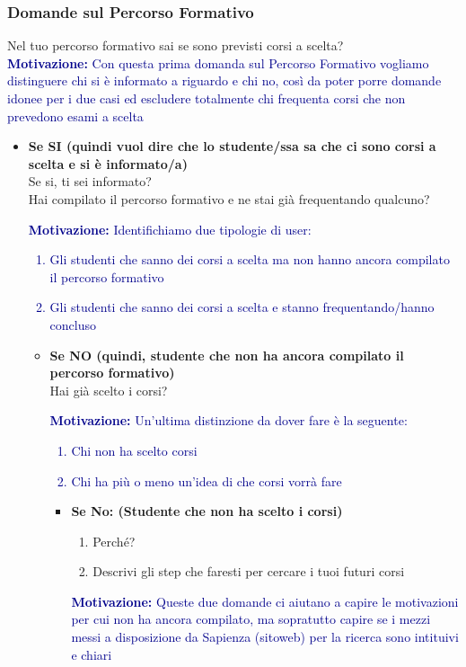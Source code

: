 \subsubsection{Domande sul Percorso Formativo}
Nel tuo percorso formativo sai se sono previsti corsi a scelta?\\
\textcolor{darkblue}{\textbf{Motivazione:} Con questa prima domanda sul Percorso Formativo vogliamo distinguere chi si è informato a riguardo e chi no, 
così da poter porre domande idonee per i due casi ed escludere totalmente chi frequenta corsi che non prevedono esami a scelta}
\begin{itemize}
    \item \textbf{Se SI (quindi vuol dire che lo studente/ssa  sa che ci sono corsi a scelta e si è informato/a)}\\
    Se si, ti sei informato?\\
    Hai compilato il percorso formativo e ne stai già frequentando qualcuno?\\
    \textcolor{darkblue}{\textbf{Motivazione:} Identifichiamo due tipologie di user:
    \begin{enumerate}
        \item Gli studenti che sanno dei corsi a scelta ma non hanno ancora compilato il percorso formativo
        \item Gli studenti che sanno dei corsi a scelta e stanno frequentando/hanno concluso
    \end{enumerate}}
    \begin{itemize}
        \item \textbf{Se NO (quindi, studente che non ha ancora compilato il percorso formativo)}\\
        Hai già scelto i corsi?\\
        \textcolor{darkblue}{\textbf{Motivazione:} Un'ultima distinzione da dover fare è la seguente:
        \begin{enumerate}
            \item Chi non ha scelto corsi
            \item Chi ha più o meno un'idea di che corsi vorrà fare
        \end{enumerate}}
        
        \begin{itemize}
            \item \textbf{Se No: (Studente che non ha scelto i corsi)}
            \begin{enumerate}
                \item Perché?
                \item Descrivi gli step che faresti per cercare i tuoi futuri corsi
            \end{enumerate}
            \textcolor{darkblue}{\textbf{Motivazione:} Queste due domande ci aiutano a capire le motivazioni per cui non ha ancora compilato, ma sopratutto capire se i mezzi
            messi a disposizione da Sapienza (sitoweb) per la ricerca sono intituivi e chiari}


\end{itemize}
\end{itemize}
\end{itemize}
